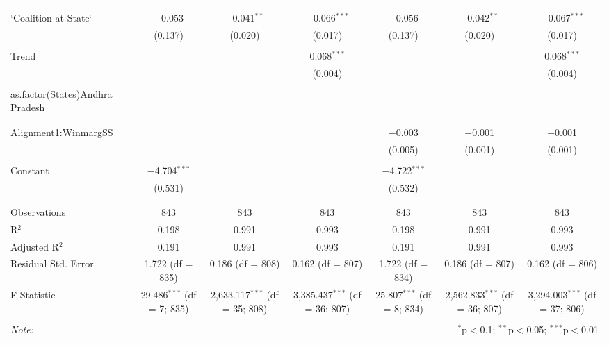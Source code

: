 \begin{table}[!htbp]
\begin{tabular}{@{\extracolsep{5pt}}lcccccc}
  & & & & & & \\ 
 `Coalition at State` & $-$0.053 & $-$0.041$^{**}$ & $-$0.066$^{***}$ & $-$0.056 & $-$0.042$^{**}$ & $-$0.067$^{***}$ \\ 
  & (0.137) & (0.020) & (0.017) & (0.137) & (0.020) & (0.017) \\ 
  & & & & & & \\ 
 Trend &  &  & 0.068$^{***}$ &  &  & 0.068$^{***}$ \\ 
  &  &  & (0.004) &  &  & (0.004) \\ 
  & & & & & & \\ 
 as.factor(States)Andhra Pradesh &  &  &  &  &  &  \\ 
  &  &  &  &  &  &  \\ 
  & & & & & & \\ 
 Alignment1:WinmargSS &  &  &  & $-$0.003 & $-$0.001 & $-$0.001 \\ 
  &  &  &  & (0.005) & (0.001) & (0.001) \\ 
  & & & & & & \\ 
 Constant & $-$4.704$^{***}$ &  &  & $-$4.722$^{***}$ &  &  \\ 
  & (0.531) &  &  & (0.532) &  &  \\ 
  & & & & & & \\ 
\hline \\[-1.8ex] 
Observations & 843 & 843 & 843 & 843 & 843 & 843 \\ 
R$^{2}$ & 0.198 & 0.991 & 0.993 & 0.198 & 0.991 & 0.993 \\ 
Adjusted R$^{2}$ & 0.191 & 0.991 & 0.993 & 0.191 & 0.991 & 0.993 \\ 
Residual Std. Error & 1.722 (df = 835) & 0.186 (df = 808) & 0.162 (df = 807) & 1.722 (df = 834) & 0.186 (df = 807) & 0.162 (df = 806) \\ 
F Statistic & 29.486$^{***}$ (df = 7; 835) & 2,633.117$^{***}$ (df = 35; 808) & 3,385.437$^{***}$ (df = 36; 807) & 25.807$^{***}$ (df = 8; 834) & 2,562.833$^{***}$ (df = 36; 807) & 3,294.003$^{***}$ (df = 37; 806) \\ 
\hline 
\hline \\[-1.8ex] 
\textit{Note:}  & \multicolumn{6}{r}{$^{*}$p$<$0.1; $^{**}$p$<$0.05; $^{***}$p$<$0.01} \\ 
\end{tabular} 
\end{table} 
